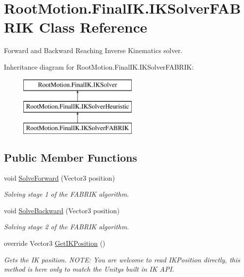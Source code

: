 \hypertarget{class_root_motion_1_1_final_i_k_1_1_i_k_solver_f_a_b_r_i_k}{}\section{Root\+Motion.\+Final\+I\+K.\+I\+K\+Solver\+F\+A\+B\+R\+IK Class Reference}
\label{class_root_motion_1_1_final_i_k_1_1_i_k_solver_f_a_b_r_i_k}


Forward and Backward Reaching Inverse Kinematics solver.  


Inheritance diagram for Root\+Motion.\+Final\+I\+K.\+I\+K\+Solver\+F\+A\+B\+R\+IK\+:\begin{figure}[H]
\begin{center}
\leavevmode
\includegraphics[height=3.000000cm]{class_root_motion_1_1_final_i_k_1_1_i_k_solver_f_a_b_r_i_k}
\end{center}
\end{figure}
\subsection*{Public Member Functions}
\begin{DoxyCompactItemize}
\item 
void \mbox{\hyperlink{class_root_motion_1_1_final_i_k_1_1_i_k_solver_f_a_b_r_i_k_a99c897ba3a3fb2df19f21fc0d37eca5c}{Solve\+Forward}} (Vector3 position)
\begin{DoxyCompactList}\small\item\em Solving stage 1 of the F\+A\+B\+R\+IK algorithm. \end{DoxyCompactList}\item 
void \mbox{\hyperlink{class_root_motion_1_1_final_i_k_1_1_i_k_solver_f_a_b_r_i_k_af9c7c452595f21656ec61bd9b6f9650e}{Solve\+Backward}} (Vector3 position)
\begin{DoxyCompactList}\small\item\em Solving stage 2 of the F\+A\+B\+R\+IK algorithm. \end{DoxyCompactList}\item 
override Vector3 \mbox{\hyperlink{class_root_motion_1_1_final_i_k_1_1_i_k_solver_f_a_b_r_i_k_a7f4bae5e4ea308ac0b86a1694e60341a}{Get\+I\+K\+Position}} ()
\begin{DoxyCompactList}\small\item\em Gets the IK position. N\+O\+TE\+: You are welcome to read I\+K\+Position directly, this method is here only to match the Unity\textquotesingle{}s built in IK A\+PI. \end{DoxyCompactList}\end{DoxyCompactItemize}
